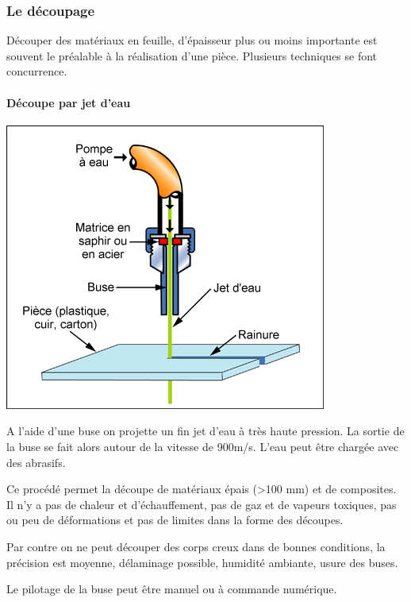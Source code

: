 \documentclass[11pt,oneside]{article}
\begin{document}
\subsubsection{Le découpage}
Découper des matériaux en feuille, d'épaisseur plus ou moins importante est souvent le préalable à la réalisation d'une pièce. Plusieurs techniques se font concurrence.

\paragraph*{Découpe par jet d'eau}

\begin{minipage}[c]{.25\linewidth}
\begin{center}
\includegraphics[width=.9\textwidth]{png/jeteau}
\end{center}
\end{minipage} \hfill
\begin{minipage}[c]{.6\linewidth}
A l'aide d'une buse on projette un fin jet d'eau à très haute pression. La sortie de la buse se fait alors autour de la vitesse de 900m/s. L'eau peut être chargée avec des abrasifs.

Ce procédé permet la découpe de matériaux épais (>100 mm) et de composites. Il n'y a pas de chaleur et d'échauffement, pas de gaz et de vapeurs toxiques, pas ou peu de déformations et pas de limites dans la forme des découpes. 
	
Par contre on ne peut découper des corps creux dans de bonnes conditions, la précision est moyenne, délaminage possible, humidité ambiante, usure des buses.

Le pilotage de la buse peut être manuel ou à commande numérique.
\end{minipage}
\end{document}
